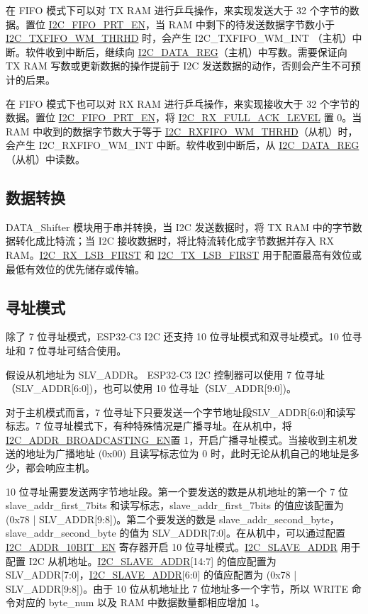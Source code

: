 \documentclass[main\_\_CN.tex]{subfiles}
\begin{document}
在 FIFO 模式下可以对 TX RAM 进行乒乓操作，来实现发送大于 32 个字节的数据。置位 \hyperref[fielddesc:I2CFIFOPRTEN]{I2C\_FIFO\_PRT\_EN}，当 RAM 中剩下的待发送数据字节数小于 \hyperref[fielddesc:I2CTXFIFOWMTHRHD]{I2C\_TXFIFO\_WM\_THRHD} 时，会产生 I2C\_TXFIFO\_WM\_INT （主机）中断。软件收到中断后，继续向 \hyperref[regdesc:I2CDATAREG]{I2C\_DATA\_REG}（主机）中写数。需要保证向 TX RAM 写数或更新数据的操作提前于 I2C 发送数据的动作，否则会产生不可预计的后果。

在 FIFO 模式下也可以对 RX RAM 进行乒乓操作，来实现接收大于 32 个字节的数据。置位 \hyperref[fielddesc:I2CFIFOPRTEN]{I2C\_FIFO\_PRT\_EN}，将 \hyperref[fielddesc:I2CRXFULLACKLEVEL]{I2C\_RX\_FULL\_ACK\_LEVEL} 置 0。当 RAM 中收到的数据字节数大于等于 \hyperref[fielddesc:I2CRXFIFOWMTHRHD]{I2C\_RXFIFO\_WM\_THRHD}（从机）时，会产生 I2C\_RXFIFO\_WM\_INT 中断。软件收到中断后，从 \hyperref[regdesc:I2CDATAREG]{I2C\_DATA\_REG}（从机）中读数。
   
\subsection{数据转换}
DATA\_Shifter 模块用于串并转换，当 I2C 发送数据时，将 TX RAM 中的字节数据转化成比特流；当 I2C 接收数据时，将比特流转化成字节数据并存入 RX RAM。\hyperref[fielddesc:I2CRXLSBFIRST]{I2C\_RX\_LSB\_FIRST} 和 \hyperref[fielddesc:I2CTXLSBFIRST]{I2C\_TX\_LSB\_FIRST} 用于配置最高有效位或最低有效位的优先储存或传输。 

\subsection{寻址模式}
除了 7 位寻址模式，ESP32-C3 I2C 还支持 10 位寻址模式和双寻址模式。10 位寻址和 7 位寻址可结合使用。

假设从机地址为 SLV\_ADDR。 ESP32-C3 I2C 控制器可以使用 7 位寻址（SLV\_ADDR[6:0])，也可以使用 10 位寻址（SLV\_ADDR[9:0])。

对于主机模式而言，7 位寻址下只要发送一个字节地址段SLV\_ADDR[6:0]和读写标志。7 位寻址模式下，有种特殊情况是广播寻址。在从机中，将 \hyperref[fielddesc:I2CADDRBROADCASTINGEN]{I2C\_ADDR\_BROADCASTING\_EN}置 1，开启广播寻址模式。当接收到主机发送的地址为广播地址 (0x00) 且读写标志位为 0 时，此时无论从机自己的地址是多少，都会响应主机。

10 位寻址需要发送两字节地址段。第一个要发送的数是从机地址的第一个 7 位 slave\_addr\_first\_7bits 和读写标志，slave\_addr\_first\_7bits 的值应该配置为 (0x78 | SLV\_ADDR[9:8])。第二个要发送的数是 slave\_addr\_second\_byte，slave\_addr\_second\_byte 的值为 SLV\_ADDR[7:0]。在从机中，可以通过配置 \hyperref[fielddesc:I2CADDR10BITEN]{I2C\_ADDR\_10BIT\_EN} 寄存器开启 10 位寻址模式。\hyperref[fielddesc:I2CSLAVEADDR]{I2C\_SLAVE\_ADDR} 用于配置 I2C 从机地址。\hyperref[fielddesc:I2CSLAVEADDR]{I2C\_SLAVE\_ADDR}[14:7] 的值应配置为 SLV\_ADDR[7:0]，\hyperref[fielddesc:I2CSLAVEADDR]{I2C\_SLAVE\_ADDR}[6:0] 的值应配置为 (0x78 | SLV\_ADDR[9:8])。由于 10 位从机地址比 7 位地址多一个字节，所以 WRITE 命令对应的 byte\_num 以及 RAM 中数据数量都相应增加 1。
\end{document}
